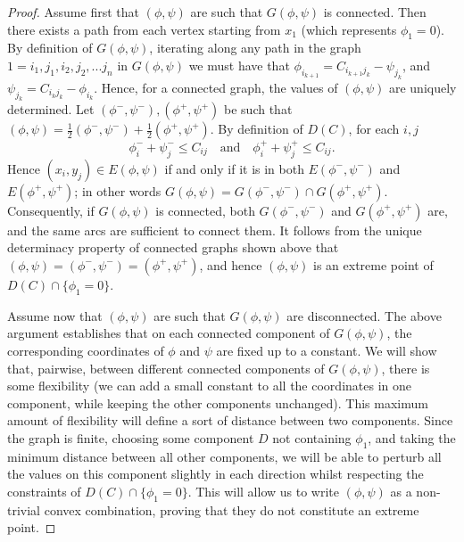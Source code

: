 \documentclass[11pt, oneside, titlepage]{book}
\theoremstyle{plain}
\theoremstyle{definition}
\begin{document}
\begin{proof}
Assume first that $(\phi, \psi)$ are such that $G(\phi, \psi)$ is connected. Then there exists a path from each vertex starting from $x_1$ (which represents $\phi_1=0$). By definition of $G(\phi, \psi)$, iterating along any path in the graph $1= i_1, j_1, i_2, j_2,...j_n$ in $G(\phi, \psi)$ we must have that $\phi_{i_{k+1}} = C_{i_{k+1}j_k} - \psi_{j_k}$, and $\psi_{j_{k}} = C_{i_kj_k} - \phi_{i_k}$. Hence, for a connected graph, the values of $(\phi, \psi)$ are uniquely determined. Let $(\phi^-, \psi^-), (\phi^+, \psi^+)$ be such that $(\phi, \psi) = \frac{1}{2}(\phi^-, \psi^-) + \frac{1}{2}(\phi^+, \psi^+)$. By definition of $D(C)$, for each $i, j$
\begin{equation*}
    \phi^-_i + \psi^-_j \leq C_{ij} \quad \text{and} \quad \phi^+_i + \psi^+_j \leq C_{ij}.
\end{equation*}
Hence $(x_i, y_j) \in E(\phi, \psi)$ if and only if it is in both $E(\phi^-, \psi^-)$ and $E(\phi^+, \psi^+)$; in other words $G(\phi, \psi) = G(\phi^-, \psi^-) \cap G(\phi^+, \psi^+)$. Consequently, if $G(\phi, \psi)$ is connected, both $G(\phi^-, \psi^-)$ and $G(\phi^+, \psi^+)$ are, and the same arcs are sufficient to connect them. It follows from the unique determinacy property of connected graphs shown above that $(\phi, \psi) = (\phi^-, \psi^-) =(\phi^+, \psi^+)$, and hence $(\phi, \psi)$ is an extreme point of $D(C)\cap\{\phi_1=0\}$.

Assume now that $(\phi, \psi)$ are such that $G(\phi, \psi)$ are disconnected. The above argument establishes that on each connected component of $G(\phi, \psi)$, the corresponding coordinates of $\phi$ and $\psi$ are fixed up to a constant. We will show that, pairwise, between different connected components of $G(\phi, \psi)$, there is some flexibility (we can add a small constant to all the coordinates in one component, while keeping the other components unchanged). This maximum amount of flexibility will define a sort of distance between two components. Since the graph is finite, choosing some component $D$ not containing $\phi_1$, and taking the minimum distance between all other components, we will be able to perturb all the values on this component slightly in each direction whilst respecting the constraints of $D(C)\cap\{\phi_1=0\}$. This will allow us to write $(\phi, \psi)$ as a non-trivial convex combination, proving that they do not constitute an extreme point.


\end{proof}
\end{document}
